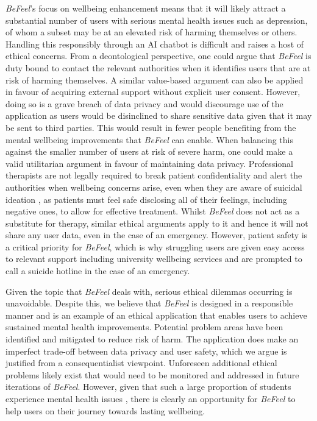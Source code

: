\documentclass[acmsmall, screen, nonacm, 9pt, a4paper,top=2cm,bottom=2cm,left=1cm,right=1cm, marginparwidth=1cm]{acmart}
\begin{document}
\emph{BeFeel}’s focus on wellbeing enhancement means that it will likely attract a substantial number of users with serious mental health issues such as depression, of whom a subset may be at an elevated risk of harming themselves or others. Handling this responsibly through an AI chatbot is difficult and raises a host of ethical concerns. From a deontological perspective, one could argue that \emph{BeFeel} is duty bound to contact the relevant authorities when it identifies users that are at risk of harming themselves. A similar value-based argument can also be applied in favour of acquiring external support without explicit user consent. However, doing so is a grave breach of data privacy and would discourage use of the application as users would be disinclined to share sensitive data given that it may be sent to third parties. This would result in fewer people benefiting from the mental wellbeing improvements that \emph{BeFeel} can enable. When balancing this against the smaller number of users at risk of severe harm, one could make a valid utilitarian argument in favour of maintaining data privacy. Professional therapists are not legally required to break patient confidentiality and alert the authorities when wellbeing concerns arise, even when they are aware of suicidal ideation \cite{NCSNCSPolicy}, as patients must feel safe disclosing all of their feelings, including negative ones, to allow for effective treatment. Whilst \emph{BeFeel} does not act as a substitute for therapy, similar ethical arguments apply to it and hence it will not share any user data, even in the case of an emergency. However, patient safety is a critical priority for \emph{BeFeel}, which is why struggling users are given easy access to relevant support including university wellbeing services and are prompted to call a suicide hotline in the case of an emergency.

Given the topic that \emph{BeFeel} deals with, serious ethical dilemmas occurring is unavoidable. Despite this, we believe that \emph{BeFeel} is designed in a responsible manner and is an example of an ethical application that enables users to achieve sustained mental health improvements. Potential problem areas have been identified and mitigated to reduce risk of harm. The application does make an imperfect trade-off between data privacy and user safety, which we argue is justified from a consequentialist viewpoint. Unforeseen additional ethical problems likely exist that would need to be monitored and addressed in future iterations of \emph{BeFeel}. However, given that such a large proportion of students experience mental health issues \cite{Macaskill2013TheKingdom}, there is clearly an opportunity for \emph{BeFeel} to help users on their journey towards lasting wellbeing.
\end{document}
